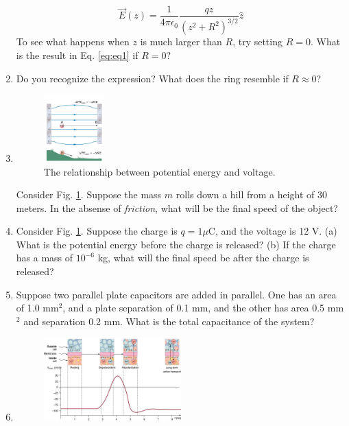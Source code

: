 \documentclass[10pt]{article}
\begin{document}
\begin{enumerate}
\begin{equation}
\vec{E}(z) = \frac{1}{4\pi \epsilon_0} \frac{q z}{\left( z^2 + R^2 \right)^{3/2}} \hat{z} \label{eq:eq1}
\end{equation}
To see what happens when $z$ is much larger than $R$, try setting $R=0$.  What is the result in Eq. \ref{eq:eq1} if $R=0$? \\ \vspace{1cm}
\item Do you recognize the expression?  What does the ring resemble if $R \approx 0$?
\item \begin{figure}[ht]
\centering
\includegraphics[width=0.22\textwidth]{hill.png}
\caption{\label{fig:hill} The relationship between potential energy and voltage.}
\end{figure}
Consider Fig. \ref{fig:hill}.  Suppose the mass $m$ rolls down a hill from a height of 30 meters.  In the absense of \textit{friction}, what will be the final speed of the object? \\ \vspace{1cm}
\item Consider Fig. \ref{fig:hill}.  Suppose the charge is $q = 1 \mu$C, and the voltage is 12 V.  (a) What is the potential energy before the charge is released? (b) If the charge has a mass of $10^{-6}$ kg, what will the final speed be after the charge is released? \\ \vspace{1.0cm}
\item Suppose two parallel plate capacitors are added in parallel.  One has an area of 1.0 mm$^2$, and a plate separation of 0.1 mm, and the other has area 0.5 mm$^2$ and separation 0.2 mm.  What is the total capacitance of the system? \\ \vspace{1cm}
\item 
\begin{figure}
\centering
\includegraphics[width=0.5\textwidth]{nerve.jpeg}

\end{figure}
\end{enumerate}
\end{document}
